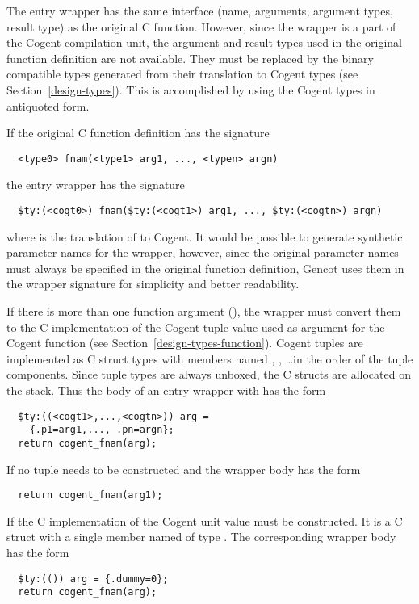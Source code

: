 The entry wrapper has the same interface (name, arguments, argument types, result type) as the original C function.
However, since the wrapper is a part of the Cogent compilation unit, the argument and result types used in the 
original function definition are not available. They must be replaced by the binary compatible types generated 
from their translation to Cogent types (see Section~\ref{design-types}). This is accomplished by using the Cogent
types in antiquoted form.

If the original C function definition has the signature
\begin{verbatim}
  <type0> fnam(<type1> arg1, ..., <typen> argn)
\end{verbatim}
the entry wrapper has the signature
\begin{verbatim}
  $ty:(<cogt0>) fnam($ty:(<cogt1>) arg1, ..., $ty:(<cogtn>) argn)
\end{verbatim}
where  is the translation of  to Cogent. It would be possible to generate synthetic 
parameter names for the wrapper, however, since the original parameter names must always be specified in the 
original function definition, Gencot uses them in the wrapper signature for simplicity and better readability.

If there is more than one function argument (), the wrapper must convert them to the C implementation
of the Cogent tuple value used as argument for the Cogent function (see Section~\ref{design-types-function}).
Cogent tuples are implemented as C struct types with members named , , \ldots in the order
of the tuple components. Since tuple types are always unboxed, the C structs are allocated on the stack. Thus
the body of an entry wrapper with  has the form
\begin{verbatim}
  $ty:((<cogt1>,...,<cogtn>)) arg = 
    {.p1=arg1,..., .pn=argn};
  return cogent_fnam(arg);
\end{verbatim}

If  no tuple needs to be constructed and the wrapper body has the form
\begin{verbatim}
  return cogent_fnam(arg1);
\end{verbatim}

If  the C implementation of the Cogent unit value must be constructed. It is a C struct with 
a single member named  of type . The corresponding wrapper body has the form
\begin{verbatim}
  $ty:(()) arg = {.dummy=0};
  return cogent_fnam(arg);
\end{verbatim}

